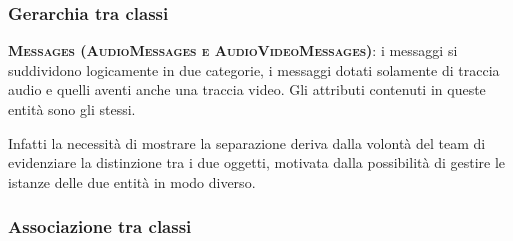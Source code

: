\subsubsection{Gerarchia tra classi}

\begin{description}
	\item{\scshape\bfseries Messages (AudioMessages e AudioVideoMessages)}: i messaggi si suddividono logicamente in due categorie, i messaggi dotati solamente di traccia audio e quelli aventi anche una traccia video. Gli attributi contenuti in queste entità sono gli stessi.
	
Infatti la necessità di mostrare la separazione deriva dalla volontà del team di evidenziare la distinzione tra i due oggetti, motivata dalla possibilità di gestire le istanze delle due entità in modo diverso.
\end{description}

\subsubsection{Associazione tra classi}

